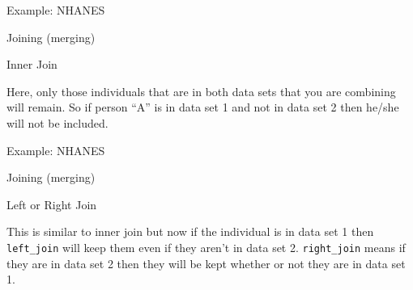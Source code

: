 \begin{frame}[fragile]{Example: NHANES}

\begin{block}{Joining (merging)}

\begin{block}{Inner Join}

Here, only those individuals that are in both data sets that you are
combining will remain. So if person ``A'' is in data set 1 and not in
data set 2 then he/she will not be included.

\begin{Shaded}
\begin{Highlighting}[]
\NormalTok{)}
\end{Highlighting}
\end{Shaded}

\end{block}

\end{block}

\end{frame}

\begin{frame}[fragile]{Example: NHANES}

\begin{block}{Joining (merging)}

\begin{block}{Left or Right Join}

This is similar to inner join but now if the individual is in data set 1
then \texttt{left\_join} will keep them even if they aren't in data set
2. \texttt{right\_join} means if they are in data set 2 then they will
be kept whether or not they are in data set 1.

\begin{Shaded}
\begin{Highlighting}[]
\end{Highlighting}
\end{Shaded}

\end{block}

\end{block}

\end{frame}

